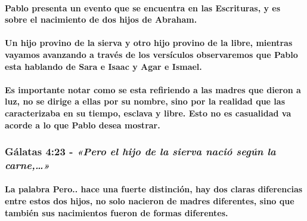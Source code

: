 \documentclass[11a pt,twoside]{article}
\newcommand{\scripture}[1]{%
  {\fontsize{12pt}{16pt}\selectfont\ScriptureFont\itshape #1}%
}
\let\oldsubsubsection\subsubsection
\renewcommand{\subsubsection}{\needspace{4\baselineskip}\oldsubsubsection}
\let\oldparagraph\paragraph
\renewcommand{\paragraph}{\needspace{3\baselineskip}\oldparagraph}
\begin{document}
\paragraph{Pablo presenta un evento que se encuentra en las Escrituras,
y es sobre el nacimiento de dos hijos de
Abraham.}\label{pablo-presenta-un-evento-que-se-encuentra-en-las-escrituras-y-es-sobre-el-nacimiento-de-dos-hijos-de-abraham.}

\paragraph{Un hijo provino de la sierva y otro hijo provino de la libre,
mientras vayamos avanzando a través de los versículos observaremos que
Pablo esta hablando de Sara e Isaac y Agar e
Ismael.}\label{un-hijo-provino-de-la-sierva-y-otro-hijo-provino-de-la-libre-mientras-vayamos-avanzando-a-travuxe9s-de-los-versuxedculos-observaremos-que-pablo-esta-hablando-de-sara-e-isaac-y-agar-e-ismael.}

\paragraph{Es importante notar como se esta refiriendo a las madres que
dieron a luz, no se dirige a ellas por su nombre, sino por la realidad
que las caracterizaba en su tiempo, esclava y libre. Esto no es
casualidad va acorde a lo que Pablo desea
mostrar.}\label{es-importante-notar-como-se-esta-refiriendo-a-las-madres-que-dieron-a-luz-no-se-dirige-a-ellas-por-su-nombre-sino-por-la-realidad-que-las-caracterizaba-en-su-tiempo-esclava-y-libre.-esto-no-es-casualidad-va-acorde-a-lo-que-pablo-desea-mostrar.}

\subsubsection{\texorpdfstring{Gálatas 4:23 -
\scripture{«Pero el hijo de la sierva nació según la carne,…»}}{Gálatas 4:23 - }}\label{guxe1latas-423---pero-el-hijo-de-la-sierva-naciuxf3-seguxfan-la-carne}

\paragraph{La palabra Pero.. hace una fuerte distinción, hay dos claras
diferencias entre estos dos hijos, no solo nacieron de madres
diferentes, sino que también sus nacimientos fueron de formas
diferentes.}\label{la-palabra-pero..-hace-una-fuerte-distinciuxf3n-hay-dos-claras-diferencias-entre-estos-dos-hijos-no-solo-nacieron-de-madres-diferentes-sino-que-tambiuxe9n-sus-nacimientos-fueron-de-formas-diferentes.}
\end{document}
